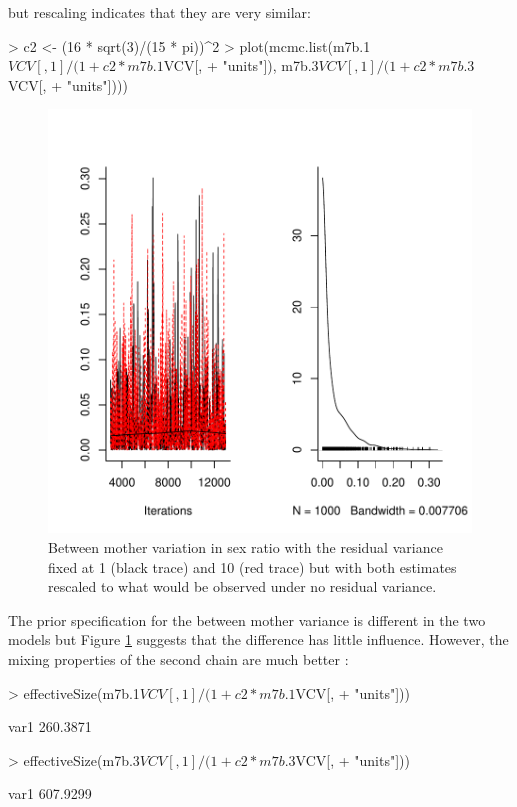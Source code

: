 \documentclass{article}
\begin{document}
but rescaling indicates that they are very similar: 

\begin{Schunk}
\begin{Sinput}
> c2 <- (16 * sqrt(3)/(15 * pi))^2
> plot(mcmc.list(m7b.1$VCV[, 1]/(1 + c2 * m7b.1$VCV[, 
+     "units"]), m7b.3$VCV[, 1]/(1 + c2 * m7b.3$VCV[, 
+     "units"])))
\end{Sinput}
\end{Schunk}

\begin{figure}[!h]
\begin{center}
\includegraphics{Lecture8-023}
\end{center}
\caption{Between mother variation in sex ratio with the residual variance fixed at 1 (black trace) and 10 (red trace) but with both estimates rescaled to what would be observed under no residual variance.}
\label{sexratio2}
\end{figure}


The prior specification for the between mother variance is different in the two models but Figure \ref{sexratio2} suggests that the difference has little influence. However, the mixing properties of the second chain are much better \citep{vanDyk.2001}:

\begin{Schunk}
\begin{Sinput}
> effectiveSize(m7b.1$VCV[, 1]/(1 + c2 * m7b.1$VCV[, 
+     "units"]))
\end{Sinput}
\begin{Soutput}
    var1 
260.3871 
\end{Soutput}
\begin{Sinput}
> effectiveSize(m7b.3$VCV[, 1]/(1 + c2 * m7b.3$VCV[, 
+     "units"]))
\end{Sinput}
\begin{Soutput}
    var1 
607.9299 
\end{Soutput}
\end{Schunk}
\end{document}
